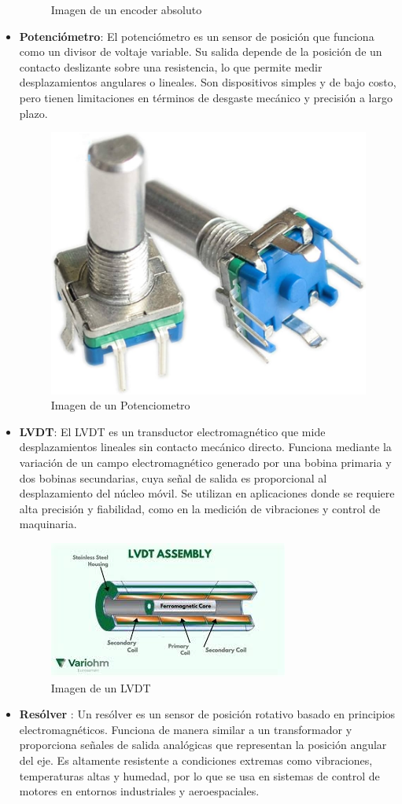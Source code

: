 \begin{itemize}
\begin{figure}[h]
	\caption{Imagen de un encoder absoluto}
	\label{fig:EncoderAb}
\end{figure}
\item \textbf{Potenciómetro}: El potenciómetro es un sensor de posición que funciona como un divisor de voltaje variable. Su salida depende de la posición de un contacto deslizante sobre una resistencia, lo que permite medir desplazamientos angulares o lineales. Son dispositivos simples y de bajo costo, pero tienen limitaciones en términos de desgaste mecánico y precisión a largo plazo.
\begin{figure}[h]
	\centering
	\includegraphics[width=4 cm]{img/Pot}
	\caption{Imagen de un Potenciometro}
	\label{fig:Pot}
\end{figure}
\item \textbf{LVDT}: El LVDT es un transductor electromagnético que mide desplazamientos lineales sin contacto mecánico directo. Funciona mediante la variación de un campo electromagnético generado por una bobina primaria y dos bobinas secundarias, cuya señal de salida es proporcional al desplazamiento del núcleo móvil. Se utilizan en aplicaciones donde se requiere alta precisión y fiabilidad, como en la medición de vibraciones y control de maquinaria.
\begin{figure}[h]
	\centering
	\includegraphics[width=10 cm]{img/LVDT}
	\caption{Imagen de un LVDT}
	\label{fig:LVDT}
\end{figure}
\item \textbf{Resólver }: Un resólver es un sensor de posición rotativo basado en principios electromagnéticos. Funciona de manera similar a un transformador y proporciona señales de salida analógicas que representan la posición angular del eje. Es altamente resistente a condiciones extremas como vibraciones, temperaturas altas y humedad, por lo que se usa en sistemas de control de motores en entornos industriales y aeroespaciales.

\end{itemize}
